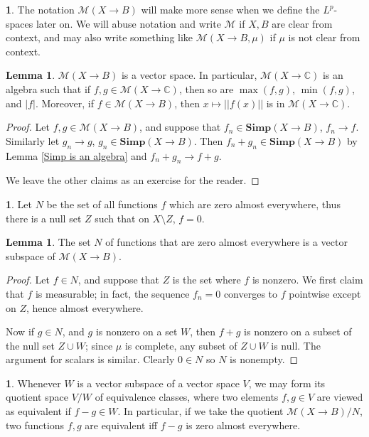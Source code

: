 \documentclass[12pt]{book}
\newcommand{\CC}{\mathbb{C}}
\newcommand{\Simp}{\mathbf{Simp}}
\theoremstyle{definition}
\newtheorem{lemma}[theorem]{Lemma}
\newtheorem{subsec}[theorem]{}
\begin{document}
\begin{subsec}
The notation $\mathcal M(X \to B)$ will make more sense when we define the $L^p$-spaces later on.
We will abuse notation and write $\mathcal M$ if $X,B$ are clear from context, and may also write something like $\mathcal M(X \to B, \mu)$ if $\mu$ is not clear from context.
\end{subsec}

\begin{lemma}
$\mathcal M(X \to B)$ is a vector space.
In particular, $\mathcal M(X \to \CC)$ is an algebra such that if $f, g \in \mathcal M(X \to \CC)$, then so are $\max(f,g)$, $\min(f,g)$, and $|f|$.
Moreover, if $f \in \mathcal M(X \to B)$, then $x \mapsto ||f(x)||$ is in $\mathcal M(X \to \CC)$.
\end{lemma}
\begin{proof}
Let $f,g \in \mathcal M(X \to B)$, and suppose that $f_n \in \Simp(X \to B)$, $f_n \to f$. Similarly let $g_n \to g$, $g_n \in \Simp(X \to B)$.
Then $f_n + g_n \in \Simp(X \to B)$ by Lemma \ref{Simp is an algebra} and $f_n + g_n \to f + g$.

We leave the other claims as an exercise for the reader.
\end{proof}

\begin{subsec}
Let $N$ be the set of all functions $f$ which are zero almost everywhere, thus there is a null set $Z$ such that on $X \setminus Z$, $f = 0$.
\end{subsec}

\begin{lemma}
The set $N$ of functions that are zero almost everywhere is a vector subspace of $\mathcal M(X \to B)$.
\end{lemma}
\begin{proof}
Let $f \in N$, and suppose that $Z$ is the set where $f$ is nonzero.
We first claim that $f$ is measurable; in fact, the sequence $f_n = 0$ converges to $f$ pointwise except on $Z$, hence almost everywhere.

Now if $g \in N$, and $g$ is nonzero on a set $W$, then $f + g$ is nonzero on a subset of the null set $Z \cup W$; since $\mu$ is complete, any subset of $Z \cup W$ is null. The argument for scalars is similar. Clearly $0 \in N$ so $N$ is nonempty.
\end{proof}

\begin{subsec}
Whenever $W$ is a vector subspace of a vector space $V$, we may form its quotient space $V/W$ of equivalence classes, where two elements $f, g \in V$ are viewed as equivalent if $f - g \in W$.
In particular, if we take the quotient $\mathcal M(X \to B)/N$, two functions $f,g$ are equivalent iff $f - g$ is zero almost everywhere.
\end{subsec}
\end{document}
